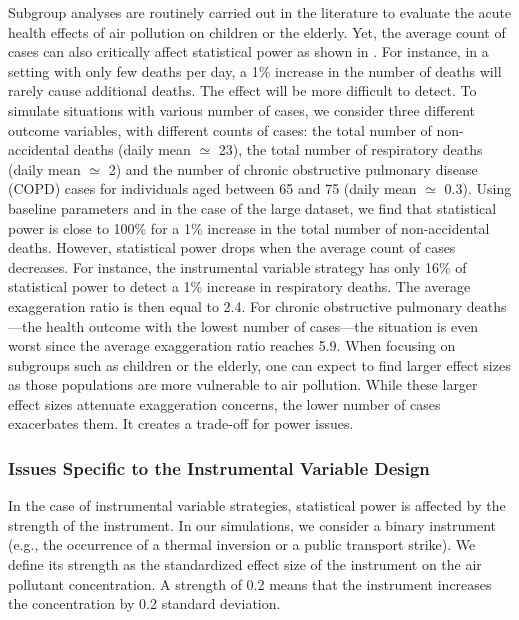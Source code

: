 \documentclass[12pt]{article}
\begin{document}
            

            Subgroup analyses are routinely carried out in the literature to evaluate the acute health effects of air pollution on children or the elderly. Yet, the average count of cases can also critically affect statistical power as shown in . For instance, in a setting with only few deaths per day, a 1\% increase in the number of deaths will rarely cause additional deaths. The effect will be more difficult to detect. To simulate situations with various number of cases, we consider three different outcome variables, with different counts of cases: the total number of non-accidental deaths (daily mean $\simeq$ 23), the total number of respiratory deaths (daily mean $\simeq$ 2) and the number of chronic obstructive pulmonary disease (COPD) cases for individuals aged between 65 and 75 (daily mean $\simeq$ 0.3). Using baseline parameters and in the case of the large dataset, we find that statistical power is close to 100\% for a 1\% increase in the total number of non-accidental deaths. However, statistical power drops when the average count of cases decreases. For instance, the instrumental variable strategy has only 16\% of statistical power to detect a 1\% increase in respiratory deaths. The average exaggeration ratio is then equal to 2.4. For chronic obstructive pulmonary deaths---the health outcome with the lowest number of cases---the situation is even worst since the average exaggeration ratio reaches 5.9. When focusing on subgroups such as children or the elderly, one can expect to find larger effect sizes as those populations are more vulnerable to air pollution. While these larger effect sizes attenuate exaggeration concerns, the lower number of cases exacerbates them. It creates a trade-off for power issues.

        \subsubsection*{Issues Specific to the Instrumental Variable Design}
        
            In the case of instrumental variable strategies, statistical power is affected by the strength of the instrument. In our simulations, we consider a binary instrument (e.g., the occurrence of a thermal inversion or a public transport strike). We define its strength as the standardized effect size of the instrument on the air pollutant concentration. A strength of 0.2 means that the instrument increases the concentration by 0.2 standard deviation. 
            
\end{document}
